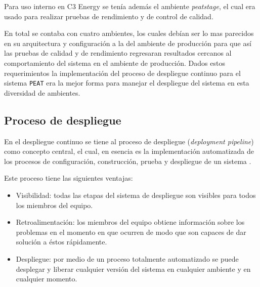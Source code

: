 Para uso interno en C3 Energy se tenía además el ambiente \textit{peatstage},
el cual era usado para realizar pruebas de rendimiento y de control de calidad.

En total se contaba con cuatro ambientes, los cuales debían ser lo mas parecidos
en su arquitectura y configuración a la del ambiente de producción para que así las
pruebas de calidad y de rendimiento regresaran resultados cercanos al comportamiento
del sistema en el ambiente de producción.
Dados estos requerimientos la implementación del proceso de despliegue continuo para
el sistema \texttt{PEAT} era la mejor forma para manejar el despliegue del sistema
en esta diversidad de ambientes.

\subsection{Proceso de despliegue}

En el despliegue continuo se tiene al proceso de despliegue (\textit{deployment
  pipeline}) como concepto central, el cual, en esencia es la implementación
automatizada de los procesos de configuración, construcción, prueba y despliegue de
un sistema \cite{28_humble_farley_2011}.

\vspace{2.5mm}

Este proceso tiene las siguientes ventajas:
\begin{itemize}
\item Visibilidad: todas las etapas del sistema de despliegue son visibles
  para todos los miembros del equipo.
\item Retroalimentación: los miembros del equipo obtiene información sobre los
  problemas en el momento en que ocurren de modo que son capaces de dar solución
  a éstos rápidamente.
\item Despliegue: por medio de un proceso totalmente automatizado se puede
  desplegar y liberar cualquier versión del sistema en cualquier ambiente y en
  cualquier momento.
\end{itemize}

